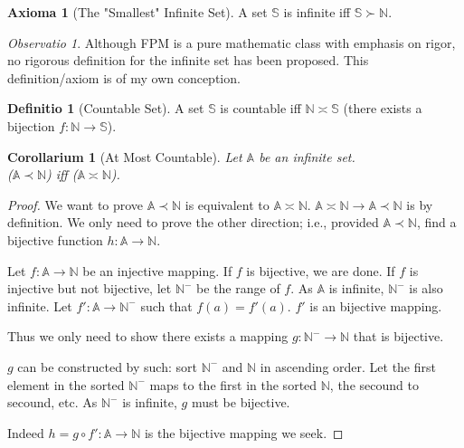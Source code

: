 \documentclass[12pt, a4paper]{report}
\newtheorem{corollary}{Corollarium}[section]
\theoremstyle{definition}
\newtheorem{definition}{Definitio}[section]
\theoremstyle{definition}
\newtheorem{axiom}{Axioma}[section]
\theoremstyle{remark}
\newtheorem{remark}{Observatio}[section]
\begin{document}
\begin{axiom}[The "Smallest" Infinite Set]
	A set $\mathbb{S}$ is infinite iff $\mathbb{S} \succ \mathbb{N}$. 
\end{axiom}

\begin{remark}
	Although FPM is a pure mathematic class with emphasis on rigor, no rigorous definition for the infinite set has been proposed. This definition/axiom is of my own conception.
\end{remark}

\begin{definition}[Countable Set]
	A set $\mathbb{S}$ is countable iff $\mathbb{N} \asymp \mathbb{S}$ (there exists a bijection $f:\mathbb{N} \rightarrow \mathbb{S}$).
\end{definition}

\begin{corollary}[At Most Countable]
	Let $\mathbb{A}$ be an infinite set. \\($\mathbb{A} \prec \mathbb{N}$) iff ($\mathbb{A} \asymp \mathbb{N}$).
\end{corollary}

\begin{proof}
	We want to prove $\mathbb{A} \prec \mathbb{N}$ is equivalent to $\mathbb{A} \asymp \mathbb{N}$. $\mathbb{A} \asymp \mathbb{N} \rightarrow \mathbb{A} \prec \mathbb{N}$ is by definition. 
	We only need to prove the other direction; i.e., provided $\mathbb{A} \prec \mathbb{N}$, find a bijective function $h: \mathbb{A} \rightarrow \mathbb{N}$.

	Let $f: \mathbb{A} \rightarrow \mathbb{N}$ be an injective mapping. If $f$ is bijective, we are done. If $f$ is injective but not bijective, let $\mathbb{N}^-$ be the range of $f.$ As $\mathbb{A}$ is infinite, $\mathbb{N}^-$ is also infinite.  
	Let $f': \mathbb{A} \rightarrow \mathbb{N}^-$ such that $f(a) = f'(a).$ $f'$ is an bijective mapping. 
	
    Thus we only need to show there exists a mapping $g: \mathbb{N}^- \rightarrow \mathbb{N}$ that is bijective. 

	$g$ can be constructed by such: sort $\mathbb{N}^-$ and $\mathbb{N}$ in ascending order. Let the first element in the sorted $\mathbb{N}^-$ maps to the first in the sorted $\mathbb{N}$, the secound to secound, etc.
	As $\mathbb{N}^-$ is infinite, $g$ must be bijective.

	Indeed $h = g \circ f': \mathbb{A} \rightarrow \mathbb{N}$ is the bijective mapping we seek. 
\end{proof}
\end{document}
